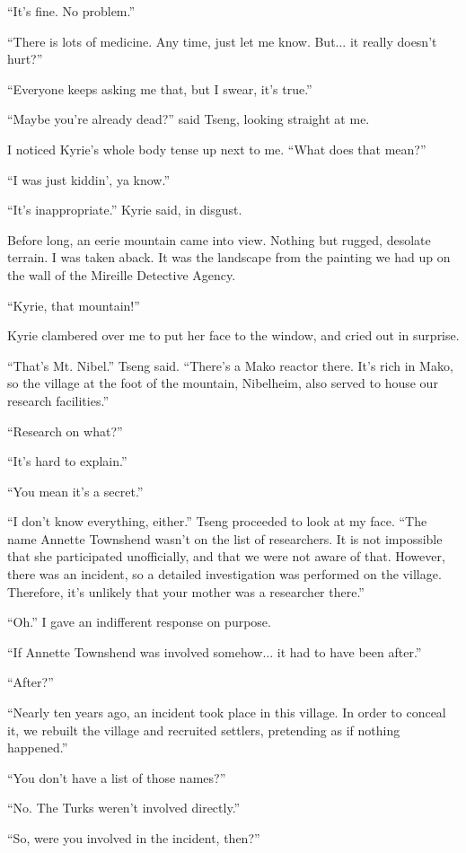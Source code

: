 \documentclass[oneside]{book}
\begin{document}
“It’s fine. No problem.”

“There is lots of medicine. Any time, just let me know. But... it really doesn’t hurt?”

“Everyone keeps asking me that, but I swear, it’s true.”

“Maybe you’re already dead?” said Tseng, looking straight at me.

I noticed Kyrie’s whole body tense up next to me. “What does that mean?”

“I was just kiddin’, ya know.”

“It’s inappropriate.” Kyrie said, in disgust.

Before long, an eerie mountain came into view. Nothing but rugged, desolate terrain. I was taken aback. It was the landscape from the painting we had up on the wall of the Mireille Detective Agency.

“Kyrie, that mountain!”

Kyrie clambered over me to put her face to the window, and cried out in surprise.

“That’s Mt. Nibel.” Tseng said. “There’s a Mako reactor there. It’s rich in Mako, so the village at the foot of the mountain, Nibelheim, also served to house our research facilities.”

“Research on what?”

“It’s hard to explain.”

“You mean it’s a secret.”

“I don’t know everything, either.” Tseng proceeded to look at my face. “The name Annette Townshend wasn’t on the list of researchers. It is not impossible that she participated unofficially, and that we were not aware of that. However, there was an incident, so a detailed investigation was performed on the village. Therefore, it’s unlikely that your mother was a researcher there.”

“Oh.” I gave an indifferent response on purpose.

“If Annette Townshend was involved somehow... it had to have been after.”

“After?”

“Nearly ten years ago, an incident took place in this village. In order to conceal it, we rebuilt the village and recruited settlers, pretending as if nothing happened.”

“You don’t have a list of those names?”

“No. The Turks weren’t involved directly.”

“So, were you involved in the incident, then?”
\end{document}

